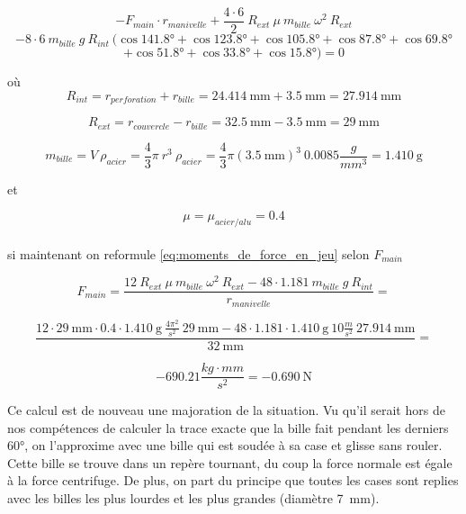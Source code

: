 \[-F_{main} \cdot r_{manivelle} + \frac{4\cdot 6}{2} \ R_{ext} \ \mu \ m_{bille} \ \omega^{2} \ R_{ext}\] 
\[- 8\cdot 6 \ m_{bille} \ g \ R_{int} \ (\cos{\ang{141.8}} + \cos{\ang{123.8}} + \cos{\ang{105.8}} + \cos{\ang{87.8}} + \cos{\ang{69.8}}\]
\begin{equation}
    + \cos{\ang{51.8}} + \cos{\ang{33.8}} + \cos{\ang{15.8}}) = 0
\label{eq:moments_de_force_en_jeu}
\end{equation}

où \[R_{int} = r_{perforation} + r_{bille} = \SI{24.414}{\milli\metre} + \SI{3.5}{\milli\metre} = \SI{27.914}{\milli\metre}\]

\[R_{ext} = r_{couvercle} - r_{bille} = \SI{32.5}{\milli\metre} - \SI{3.5}{\milli\metre} = \SI{29}{\milli\metre} \]

\[m_{bille} = V \ \rho_{acier} = \frac{4}{3}\pi \ r^{3} \ \rho_{acier} = \frac{4}{3} \pi (\SI{3.5}{\milli\metre})^{3} \ 0.0085 \frac{g}{mm^{3}} = \SI{1.410}{\g}\]

et

\[ \mu = \mu_{acier/alu} = 0.4\]
\\
si maintenant on reformule \ref{eq:moments_de_force_en_jeu} selon $F_{main}$

\[F_{main} = \frac{12 \ R_{ext} \ \mu \ m_{bille} \ \omega^{2} \ R_{ext} - 48 \cdot 1.181 \ m_{bille} \ g \ R_{int}}{r_{manivelle}} = \]

\[\frac{12 \cdot \SI{29}{\milli\metre} \cdot 0.4 \cdot \SI{1.410}{\g} \ \frac{4 \pi^{2}}{s^{2}} \ \SI{29}{\milli\metre} - 48 \cdot 1.181\cdot \SI{1.410}{\g} \ 10\frac{m}{s^{2}} \ \SI{27.914}{\milli\metre}}{\SI{32}{\milli\metre}} =\]

\begin{equation}
    -690.21 \frac{kg\cdot mm}{s^{2}} = \SI{-0.690}{\N}
    \label{eq:F_main}
\end{equation}

Ce calcul est de nouveau une majoration de la situation. Vu qu'il serait hors de nos compétences de calculer la trace exacte que la bille fait pendant les derniers \ang{60}, on l'approxime avec une bille qui est soudée à sa case et glisse sans rouler. Cette bille se trouve dans un repère tournant, du coup la force normale est égale à la force centrifuge. De plus, on part du principe que toutes les cases sont replies avec les billes les plus lourdes et les plus grandes (diamètre \SI{7}{\milli\metre}).


